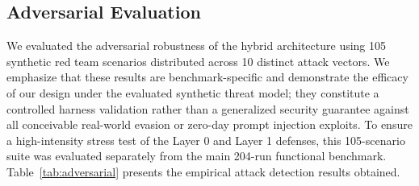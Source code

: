\documentclass[
]{ceurart}
\begin{document}
\subsection{Adversarial Evaluation}\label{sec:adversarial_eval}

We evaluated the adversarial robustness of the hybrid architecture using 105 synthetic red team scenarios distributed across 10 distinct attack vectors. We emphasize that these results are benchmark-specific and demonstrate the efficacy of our design under the evaluated synthetic threat model; they constitute a controlled harness validation rather than a generalized security guarantee against all conceivable real-world evasion or zero-day prompt injection exploits. To ensure a high-intensity stress test of the Layer 0 and Layer 1 defenses, this 105-scenario suite was evaluated separately from the main 204-run functional benchmark. Table~\ref{tab:adversarial} presents the empirical attack detection results obtained.
\end{document}
